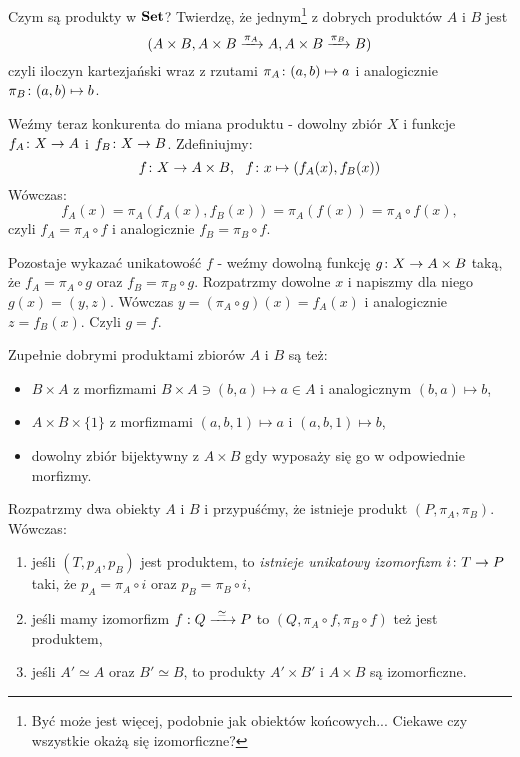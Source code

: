 \begin{exmp}
	Czym są produkty w $\Set$? Twierdzę, że jednym\footnote{Być może jest więcej, podobnie jak obiektów końcowych... Ciekawe czy wszystkie okażą się izomorficzne?} z dobrych produktów $A$ i $B$ jest $$(A\times B, \morpharr{\pi_A}{A\times B}A, \morpharr{\pi_B}{A\times B}B)$$
  czyli iloczyn kartezjański wraz z rzutami $\actsas{\pi_A}{(a, b)}a$ i analogicznie $\actsas{\pi_B}{(a, b)}b$.

  Weźmy teraz konkurenta do miana produktu - dowolny zbiór $X$ i funkcje $\morph {f_A}XA$ i $\morph {f_B}XB$. Zdefiniujmy:
  $$\morph f X {A\times B}, ~~\actsas{f}{x}{(f_A(x), f_B(x))}$$
  Wówczas:
	$$f_A(x) = \pi_A(f_A(x), f_B(x)) = \pi_A(f(x)) = \pi_A\circ f(x),$$
	czyli $f_A = \pi_A\circ f$ i analogicznie $f_B = \pi_B\circ f$.

  Pozostaje wykazać unikatowość $f$ - weźmy dowolną funkcję $\morph gX{A\times B}$ taką, że $f_A = \pi_A\circ g$ oraz $f_B = \pi_B \circ g$.
  Rozpatrzmy dowolne $x$ i napiszmy dla niego $g(x) = (y, z)$. Wówczas $y = (\pi_A\circ g)(x) = f_A(x)$ i analogicznie $z=f_B(x)$. Czyli $g=f$.
\end{exmp}

\begin{remk}
  Zupełnie dobrymi produktami zbiorów $A$ i $B$ są też:
  \begin{itemize}
    \item $B\times A$ z morfizmami $B\times A \ni (b, a)\mapsto a\in A$ i analogicznym $(b, a)\mapsto b$,
    \item $A\times B\times \{1\}$ z morfizmami $(a, b, 1)\mapsto a$ i $(a, b, 1)\mapsto b$,
    \item dowolny zbiór bijektywny z $A\times B$ gdy wyposaży się go w odpowiednie morfizmy.
  \end{itemize}
\end{remk}

\begin{thm}
  \label{thm:uniqueprod}
  Rozpatrzmy dwa obiekty $A$ i $B$ i przypuśćmy, że istnieje produkt $(P, \pi_A, \pi_B)$. Wówczas:
  \begin{enumerate}
    \item jeśli $(T, p_A, p_B)$ jest produktem, to \emph{istnieje unikatowy izomorfizm} $\morph iTP$ taki, że $p_A = \pi_A\circ i$ oraz $p_B = \pi_B\circ i$,
    \item jeśli mamy izomorfizm $\isomorph fQP$ to $(Q, \pi_A \circ f, \pi_B\circ f)$ też jest produktem,
    \item jeśli $A'\simeq A$ oraz $B'\simeq B$, to produkty $A' \times B'$ i $A\times B$ są izomorficzne.
  \end{enumerate}
\end{thm}

